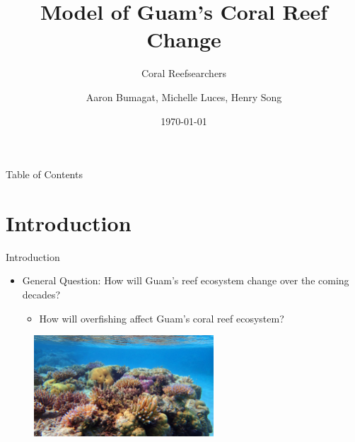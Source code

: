 \documentclass{beamer}
\title[]{Model of Guam's Coral Reef Change}
\subtitle{Coral Reefsearchers}
\author{Aaron Bumagat, Michelle Luces, Henry Song }
\institute{University of Guam}
\date{\today}
\begin{document}
\frame{\titlepage}

\AtBeginSection[]{
    \begin{frame}{}
        \frametitle{}
        \setcounter{tocdepth}{2}
        \tableofcontents[currentsection, sections = \thesection]
        \setcounter{tocdepth}{1}
    \end{frame}
}

\begin{frame}{Table of Contents}
\tableofcontents
\end{frame}

\section{Introduction}
\begin{frame}{Introduction}
\begin{itemize}
    \item General Question: How will Guam's reef ecosystem change over the coming decades?
        \begin{itemize}
            \item How will overfishing affect Guam's coral reef ecosystem?
        \end{itemize}
\end{itemize}
\begin{figure}
    \centering
    \includegraphics[width=0.6\textwidth]{Figures/coral_picture.jpg}
\end{figure}
\end{frame}

\end{document}
